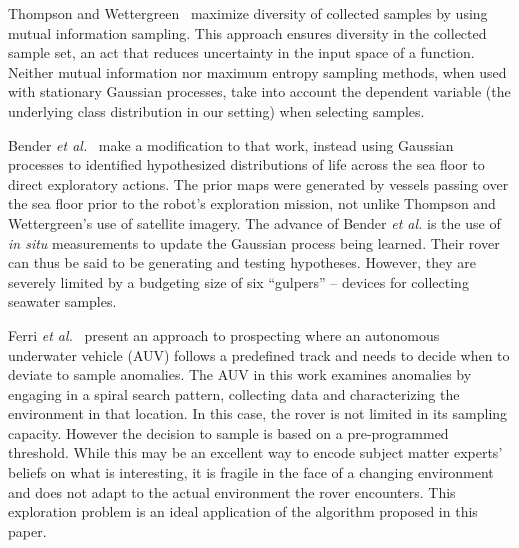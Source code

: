 
Thompson and Wettergreen~\cite{thompson2008intelligent} maximize diversity of
collected samples by using mutual information sampling.  This approach ensures
diversity in the collected sample set, an act that reduces uncertainty in the
input space of a function.  Neither mutual information nor maximum entropy
sampling methods, when used with stationary Gaussian processes, take into
account the dependent variable (the underlying class distribution in our setting) when selecting samples.


Bender \emph{et al.}~\cite{bender2013autonomous} make a modification to that work, instead using Gaussian processes to
identified hypothesized distributions of life across the sea floor to direct
exploratory actions.  The prior maps were generated by vessels passing over the
sea floor prior to the robot's exploration mission, not unlike Thompson and Wettergreen's use of satellite imagery.  The advance of Bender \emph{et al.} is the use of \emph{in situ} measurements to
update the Gaussian process being learned.  Their rover can thus
be said to be generating and testing hypotheses.  However, they are severely
limited by a budgeting size of six ``gulpers'' -- devices for collecting
seawater samples.


Ferri \emph{et al.}~\cite{ferri2010novel} present an approach to prospecting where an autonomous underwater vehicle (AUV) follows a predefined track and needs to decide when to deviate to sample anomalies.  The AUV in this work examines anomalies by engaging in a spiral search pattern, collecting data and characterizing the environment in that location.  In this case, the rover is not limited in its sampling capacity.  However the decision to sample is based on a pre-programmed threshold.  While this may be an excellent way to encode subject matter experts' beliefs on what is interesting, it is fragile in the face of a changing environment and does not adapt to the actual environment the rover encounters.  This exploration problem is an ideal application of the algorithm proposed in this paper.
 
% 
% 

